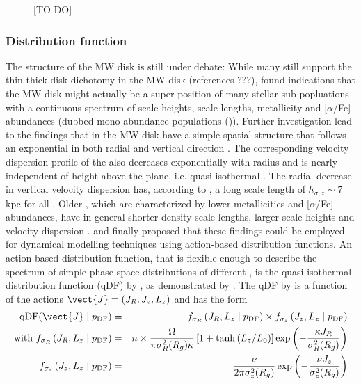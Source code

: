 

\begin{figure}
\caption{[TO DO]}
\label{fig:ref_pots}
\end{figure}


\subsubsection{Distribution function} \label{sec:qDF}

The structure of the MW disk is still under debate: While many still support the thin-thick disk dichotomy in the MW disk (references ???), \citet{bov12b} found indications that the MW disk might actually be a super-position of many stellar sub-popluations with a continuous spectrum of scale heights, scale lengths, metallicity and [$\alpha$/Fe] abundances (dubbed mono-abundance populations (\MAPs)). Further investigation lead to the findings that \MAPs in the MW disk have a simple spatial structure that follows an exponential in both radial and vertical direction \citep{bov12d}. The corresponding velocity dispersion profile of the \MAPs also decreases exponentially with radius and is nearly independent of height above the plane, i.e. quasi-isothermal \citep{bov12c}. The radial decrease in vertical velocity dispersion has, according to \citet{bov12c}, a long scale length of $h_{\sigma,z} \sim 7$ kpc for all \MAPs. Older \MAPs, which are characterized by lower metallicities and [$\alpha$/Fe] abundances, have in general shorter density scale lengths, larger scale heights and velocity dispersion \citep{bov12d}. \citet{tin13} and \citet{bov13} finally proposed that these findings could be employed for dynamical modelling techniques using action-based distribution functions. An action-based distribution function, that is flexible enough to describe the spectrum of simple phase-space distributions of different \MAPs, is the quasi-isothermal distribution function (qDF) by \citet{bin11}, as demonstrated by \citet{tin13}.  The qDF by \citet{bin11} is a function of the actions $\vect{J}=(J_R,J_z,L_z)$ and has the form
\begin{eqnarray*}
\text{qDF}(\vect{J} \mid p_\text{DF}) &=& f_{\sigma_R}\left(J_R,L_z \mid p_\text{DF}\right) \times f_{\sigma_z}\left(J_z,L_z \mid p_\text{DF}\right)\\
\text{with } f_{\sigma_R}\left(J_R,L_z \mid p_\text{DF}\right) &=& n \times \frac{\Omega}{\pi\sigma_R^2(R_g) \kappa}\left[1+\tanh\left(L_z/L_0\right) \right]\exp\left(-\frac{\kappa J_R}{\sigma_R^2(R_g)} \right) \\
f_{\sigma_z}\left(J_z,L_z \mid p_\text{DF} \right) &=& \frac{\nu}{2 \pi \sigma_z^2(R_g)} \exp\left( -\frac{\nu J_z}{\sigma_z^2(R_g)} \right) \\
\end{eqnarray*}
